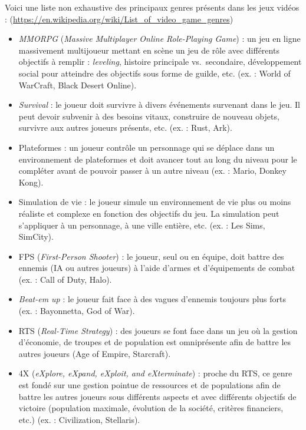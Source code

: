 

Voici une liste non exhaustive des principaux genres présents dans les jeux vidéos : (\url{https://en.wikipedia.org/wiki/List_of_video_game_genres})
\begin{itemize}
\label{MMORPG}
    \item \emph{MMORPG} (\emph{Massive Multiplayer Online Role-Playing Game}) : un jeu en ligne massivement multijoueur mettant en scène un jeu de rôle avec différents objectifs à remplir : \emph{leveling}, histoire principale vs.\ secondaire, développement social pour atteindre des objectifs sous forme de guilde, etc. (ex. : World of WarCraft, Black Desert Online).
    \item \emph{Survival} : le joueur doit survivre à divers événements survenant dans le jeu. Il peut devoir subvenir à des besoins vitaux, construire de nouveau objets, survivre aux autres joueurs présents, etc. (ex. : Rust, Ark).
    \item Plateformes : un joueur contrôle un personnage qui se déplace dans un environnement de plateformes et doit avancer tout au long du niveau pour le compl\'eter avant de pouvoir passer à un autre niveau (ex. : Mario, Donkey Kong).
    \item Simulation de vie : le joueur simule un environnement de vie plus ou moins réaliste et complexe en fonction des objectifs du jeu. La simulation peut s'appliquer à un personnage, à une ville entière, etc. (ex. : Les Sims, SimCity).
    \item FPS (\emph{First-Person Shooter}) : le joueur, seul ou en équipe, doit battre des ennemis (IA ou autres joueurs) à l'aide d'armes et d'équipements de combat (ex. : Call of Duty, Halo).
    \item \emph{Beat-em up} : le joueur fait face à des vagues d'ennemis toujours plus forts (ex. : Bayonnetta, God of War).
    \item RTS (\emph{Real-Time Strategy}) : des joueurs se font face dans un jeu o\`u la gestion d'économie, de troupes et de population est omniprésente afin de battre les autres joueurs (Age of Empire, Starcraft).
    \item 4X (\emph{eXplore, eXpand, eXploit, and eXterminate}) : proche du RTS, ce genre est fondé sur une gestion pointue de ressources et de populations afin de battre les autres joueurs sous différents aspects et avec différents objectifs de victoire (population maximale, évolution de la société, critères financiers, etc.) (ex. : Civilization, Stellaris).

\end{itemize}
